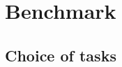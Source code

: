 \documentclass[11pt]{report}
\begin{document}








\chapter{Benchmark}
\section{Choice of tasks}
\end{document}
